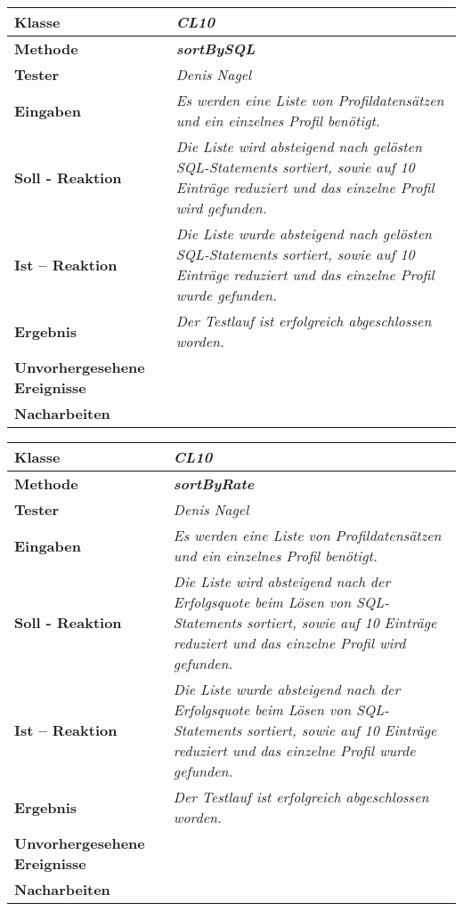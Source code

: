 \begin{longtable}{|p{4cm}|p{11cm}|}
\hline
\textbf{Klasse} & \textit{\textbf{CL10}} \\
\hline
\textbf{Methode} & \textit{\textbf{sortBySQL}} \\
\hline
\textbf{Tester} & \textit{Denis Nagel} \\
\hline
\textbf{Eingaben} & \textit{Es werden eine Liste von Profildatensätzen und ein einzelnes Profil benötigt.} \\
\hline
\textbf{Soll - Reaktion} & \textit{Die Liste wird absteigend nach gelösten SQL-Statements sortiert, sowie auf 10 Einträge reduziert und das einzelne Profil wird gefunden.} \\
\hline
\textbf{Ist -- Reaktion} & \textit{Die Liste wurde absteigend nach gelösten SQL-Statements sortiert, sowie auf 10 Einträge reduziert und das einzelne Profil wurde gefunden.} \\
\hline
\textbf{Ergebnis} & \textit{Der Testlauf ist erfolgreich abgeschlossen worden.} \\
\hline
\textbf{Unvorhergesehene Ereignisse} &
\textit{} \\
\hline
\textbf{Nacharbeiten } & \textit{} \\
\hline
\end{longtable}

\begin{longtable}{|p{4cm}|p{11cm}|}
\hline
\textbf{Klasse} & \textit{\textbf{CL10}} \\
\hline
\textbf{Methode} & \textit{\textbf{sortByRate}} \\
\hline
\textbf{Tester} & \textit{Denis Nagel} \\
\hline
\textbf{Eingaben} & \textit{Es werden eine Liste von Profildatensätzen und ein einzelnes Profil benötigt.} \\
\hline
\textbf{Soll - Reaktion} & \textit{Die Liste wird absteigend nach der Erfolgsquote beim Lösen von SQL-Statements sortiert, sowie auf 10 Einträge reduziert und das einzelne Profil wird gefunden.} \\
\hline
\textbf{Ist -- Reaktion} & \textit{Die Liste wurde absteigend nach der Erfolgsquote beim Lösen von SQL-Statements sortiert, sowie auf 10 Einträge reduziert und das einzelne Profil wurde gefunden.} \\
\hline
\textbf{Ergebnis} & \textit{Der Testlauf ist erfolgreich abgeschlossen worden.} \\
\hline
\textbf{Unvorhergesehene Ereignisse} &
\textit{} \\
\hline
\textbf{Nacharbeiten } & \textit{} \\
\hline
\end{longtable}

